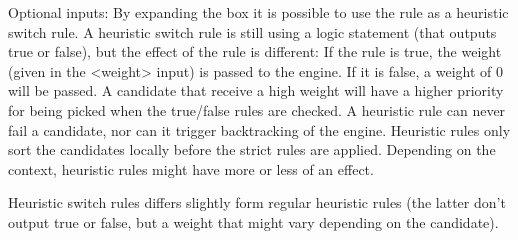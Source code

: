 Optional inputs:
By expanding the box it is possible to use the rule as a heuristic switch 
rule. A heuristic switch rule is still using a logic statement (that 
outputs true or false), but the effect of the rule is different: If the rule 
is true, the weight (given in the <weight> input) is passed to the engine. 
If it is false, a weight of 0 will be passed. A candidate that receive a 
high weight will have a higher priority for being picked when the true/false 
rules are checked. A heuristic rule can never fail a candidate, nor can it 
trigger backtracking of the engine. Heuristic rules only sort the 
candidates locally before the strict rules are applied. Depending on the 
context, heuristic rules might have more or less of an effect. 

Heuristic switch rules differs slightly form regular heuristic rules (the 
latter don't output true or false, but a weight that might vary depending
on the candidate).


